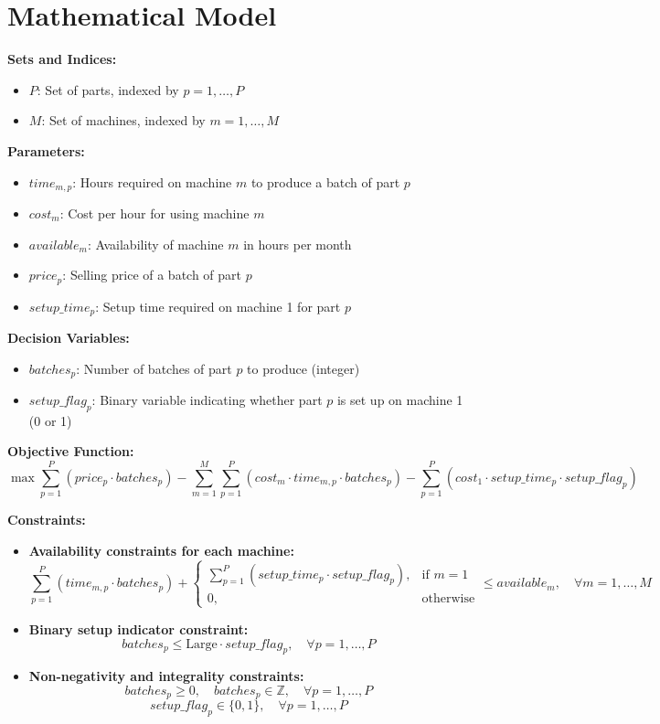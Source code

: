 \documentclass{article}
\begin{document}
\section*{Mathematical Model}

\textbf{Sets and Indices:}
\begin{itemize}
    \item $P$: Set of parts, indexed by $p = 1, \ldots, P$
    \item $M$: Set of machines, indexed by $m = 1, \ldots, M$
\end{itemize}

\textbf{Parameters:}
\begin{itemize}
    \item $time_{m,p}$: Hours required on machine $m$ to produce a batch of part $p$
    \item $cost_{m}$: Cost per hour for using machine $m$
    \item $available_{m}$: Availability of machine $m$ in hours per month
    \item $price_{p}$: Selling price of a batch of part $p$
    \item $setup\_time_{p}$: Setup time required on machine 1 for part $p$
\end{itemize}

\textbf{Decision Variables:}
\begin{itemize}
    \item $batches_{p}$: Number of batches of part $p$ to produce (integer)
    \item $setup\_flag_{p}$: Binary variable indicating whether part $p$ is set up on machine 1 (0 or 1)
\end{itemize}

\textbf{Objective Function:}
\[
\max \sum_{p=1}^{P} \left( price_{p} \cdot batches_{p} \right) - \sum_{m=1}^{M} \sum_{p=1}^{P} \left( cost_{m} \cdot time_{m,p} \cdot batches_{p} \right) - \sum_{p=1}^{P} \left( cost_{1} \cdot setup\_time_{p} \cdot setup\_flag_{p} \right)
\]

\textbf{Constraints:}

\begin{itemize}
    \item \textbf{Availability constraints for each machine:}
    \[
    \sum_{p=1}^{P} \left( time_{m,p} \cdot batches_{p} \right) + \begin{cases} 
    \sum_{p=1}^{P} \left( setup\_time_{p} \cdot setup\_flag_{p} \right), & \text{if } m = 1 \\
    0, & \text{otherwise}
    \end{cases} \leq available_{m}, \quad \forall m = 1, \ldots, M
    \]

    \item \textbf{Binary setup indicator constraint:}
    \[
    batches_{p} \leq \text{Large} \cdot setup\_flag_{p}, \quad \forall p = 1, \ldots, P
    \]

    \item \textbf{Non-negativity and integrality constraints:}
    \[
    batches_{p} \geq 0, \quad batches_{p} \in \mathbb{Z}, \quad \forall p = 1, \ldots, P
    \]
    \[
    setup\_flag_{p} \in \{0, 1\}, \quad \forall p = 1, \ldots, P
    \]
\end{itemize}
\end{document}

